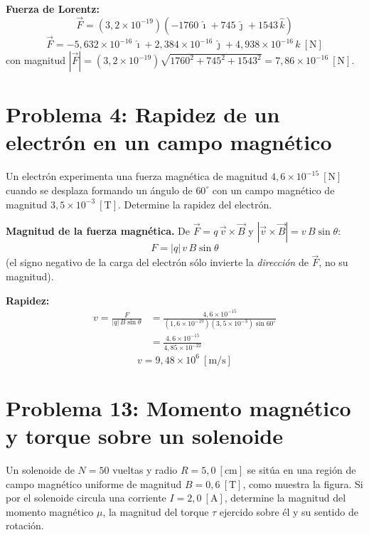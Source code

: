 \documentclass[12pt,letterpaper]{article}
\begin{document}
\noindent\textbf{Fuerza de Lorentz:}
\[
    \vec{F} = (3{,}2\times10^{-19})\left(-1760\,\hat{\imath} + 745\,\hat{\jmath} + 1543\,\hat{k}\right)
\]
\[
    \boxed{\vec{F} = -5{,}632\times10^{-16}\,\hat{\imath} + 2{,}384\times10^{-16}\,\hat{\jmath}
                     + 4{,}938\times10^{-16}\,\hat{k}\ [\text{N}]}
\]
con magnitud
$|\vec{F}| = (3{,}2\times10^{-19})\sqrt{1760^2 + 745^2 + 1543^2} = 7{,}86\times10^{-16}\ [\text{N}]$.

\vspace{0.6cm}

\section*{Problema 4: Rapidez de un electr\'on en un campo magn\'etico}

\noindent Un electr\'on experimenta una fuerza magn\'etica de magnitud $4{,}6\times10^{-15}\ [\text{N}]$
cuando se desplaza formando un \'angulo de $60^\circ$ con un campo magn\'etico de magnitud
$3{,}5\times10^{-3}\ [\text{T}]$. Determine la rapidez del electr\'on.

\medskip
\noindent\textbf{Magnitud de la fuerza magn\'etica.} De $\vec{F} = q\,\vec{v}\times\vec{B}$ y
$|\vec{v}\times\vec{B}| = v\,B\sin\theta$:
\[
    F = |q|\,v\,B\sin\theta
\]
(el signo negativo de la carga del electr\'on s\'olo invierte la \emph{direcci\'on} de $\vec{F}$,
no su magnitud).

\medskip
\noindent\textbf{Rapidez:}
\begin{align*}
    v = \frac{F}{|q|\,B\sin\theta}
      &= \frac{4{,}6\times10^{-15}}{(1{,}6\times10^{-19})(3{,}5\times10^{-3})\sin60^\circ}\\[4pt]
      &= \frac{4{,}6\times10^{-15}}{4{,}85\times10^{-22}}
\end{align*}
\[
    \boxed{v = 9{,}48\times10^{6}\ [\text{m/s}]}
\]

\newpage

\section*{Problema 13: Momento magn\'etico y torque sobre un solenoide}

\noindent Un solenoide de $N = 50$ vueltas y radio $R = 5{,}0\ [\text{cm}]$ se sit\'ua en una
regi\'on de campo magn\'etico uniforme de magnitud $B = 0{,}6\ [\text{T}]$, como muestra la figura.
Si por el solenoide circula una corriente $I = 2{,}0\ [\text{A}]$, determine la magnitud del momento
magn\'etico $\mu$, la magnitud del torque $\tau$ ejercido sobre \'el y su sentido de rotaci\'on.
\end{document}
